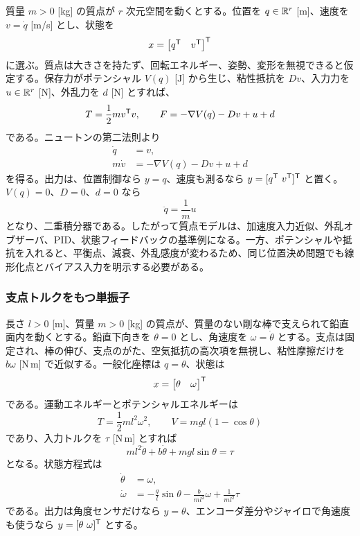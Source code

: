 質量 $m>0$ [kg] の質点が $r$ 次元空間を動くとする。位置を $q\in\mathbb{R}^r$ [m]、速度を $v=\dot{q}$ [m/s] とし、状態を
\begin{equation}
  x=
  \begin{bmatrix}
    q^{\mathsf{T}}&v^{\mathsf{T}}
  \end{bmatrix}^{\mathsf{T}}
\end{equation}
に選ぶ。質点は大きさを持たず、回転エネルギー、姿勢、変形を無視できると仮定する。保存力がポテンシャル $V(q)$ [J] から生じ、粘性抵抗を $D v$、入力力を $u\in\mathbb{R}^r$ [N]、外乱力を $d$ [N] とすれば、
\begin{equation}
  T=\frac{1}{2}m v^{\mathsf{T}} v,
  \qquad
  F=-\nabla V(q)-Dv+u+d
\end{equation}
である。ニュートンの第二法則より
\begin{align}
  \dot{q}&=v,\\
  m\dot{v}&=-\nabla V(q)-Dv+u+d
\end{align}
を得る。出力は、位置制御なら $y=q$、速度も測るなら $y=[q^{\mathsf{T}}\ v^{\mathsf{T}}]^{\mathsf{T}}$ と置く。$V(q)=0$、$D=0$、$d=0$ なら
\begin{equation}
  \ddot{q}=\frac{1}{m}u
\end{equation}
となり、二重積分器である。したがって質点モデルは、加速度入力近似、外乱オブザーバ、PID、状態フィードバックの基準例になる。一方、ポテンシャルや抵抗を入れると、平衡点、減衰、外乱感度が変わるため、同じ位置決め問題でも線形化点とバイアス入力を明示する必要がある。

\subsubsection{支点トルクをもつ単振子}

長さ $l>0$ [m]、質量 $m>0$ [kg] の質点が、質量のない剛な棒で支えられて鉛直面内を動くとする。鉛直下向きを $\theta=0$ とし、角速度を $\omega=\dot{\theta}$ とする。支点は固定され、棒の伸び、支点のがた、空気抵抗の高次項を無視し、粘性摩擦だけを $b\omega$ [N\,m] で近似する。一般化座標は $q=\theta$、状態は
\begin{equation}
  x=
  \begin{bmatrix}
    \theta&\omega
  \end{bmatrix}^{\mathsf{T}}
\end{equation}
である。運動エネルギーとポテンシャルエネルギーは
\begin{equation}
  T=\frac{1}{2}ml^2\omega^2,
  \qquad
  V=mgl(1-\cos\theta)
\end{equation}
であり、入力トルクを $\tau$ [N\,m] とすれば
\begin{equation}
  ml^2\ddot{\theta}+b\dot{\theta}+mgl\sin\theta=\tau
\end{equation}
となる。状態方程式は
\begin{align}
  \dot{\theta}&=\omega,\\
  \dot{\omega}&=-\frac{g}{l}\sin\theta-\frac{b}{ml^2}\omega+\frac{1}{ml^2}\tau
\end{align}
である。出力は角度センサだけなら $y=\theta$、エンコーダ差分やジャイロで角速度も使うなら $y=[\theta\ \omega]^{\mathsf{T}}$ とする。

